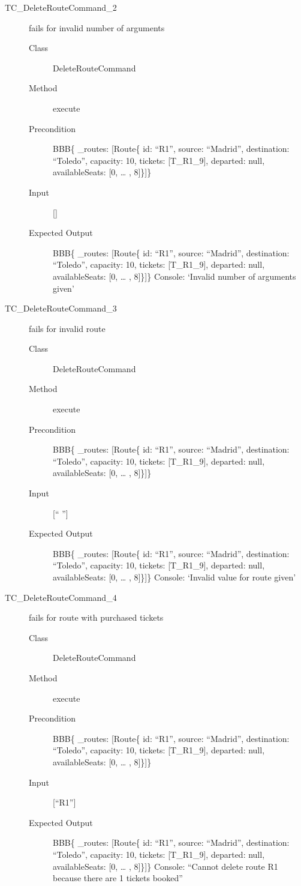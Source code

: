 \documentclass[11pt]{article}
\begin{document}
\begin{description}
\item[{TC\_DeleteRouteCommand\_2}] fails for invalid number of arguments
\begin{description}
\item[{Class}] DeleteRouteCommand
\item[{Method}] execute
\item[{Precondition}] BBB\{ \_routes: [Route\{ id: “R1”, source: “Madrid”, destination: “Toledo”, capacity: 10,  tickets: [T\_R1\_9], departed: null, availableSeats: [0, … , 8]\}]\}
\item[{Input}] []
\item[{Expected Output}] BBB\{ \_routes: [Route\{ id: “R1”, source: “Madrid”, destination: “Toledo”, capacity: 10,  tickets: [T\_R1\_9], departed: null, availableSeats: [0, … , 8]\}]\}
Console: ‘Invalid number of arguments given’
\end{description}

\item[{TC\_DeleteRouteCommand\_3}] fails for invalid route
\begin{description}
\item[{Class}] DeleteRouteCommand
\item[{Method}] execute
\item[{Precondition}] BBB\{ \_routes: [Route\{ id: “R1”, source: “Madrid”, destination: “Toledo”, capacity: 10,  tickets: [T\_R1\_9], departed: null, availableSeats: [0, … , 8]\}]\}
\item[{Input}] [“ ”]
\item[{Expected Output}] BBB\{ \_routes: [Route\{ id: “R1”, source: “Madrid”, destination: “Toledo”, capacity: 10,  tickets: [T\_R1\_9], departed: null, availableSeats: [0, … , 8]\}]\}
Console: ‘Invalid value for route given’
\end{description}

\item[{TC\_DeleteRouteCommand\_4}] fails for route with purchased tickets
\begin{description}
\item[{Class}] DeleteRouteCommand
\item[{Method}] execute
\item[{Precondition}] BBB\{ \_routes: [Route\{ id: “R1”, source: “Madrid”, destination: “Toledo”, capacity: 10,  tickets: [T\_R1\_9], departed: null, availableSeats: [0, … , 8]\}]\}
\item[{Input}] [“R1”]
\item[{Expected Output}] BBB\{ \_routes: [Route\{ id: “R1”, source: “Madrid”, destination: “Toledo”, capacity: 10,  tickets: [T\_R1\_9], departed: null, availableSeats: [0, … , 8]\}]\}
Console: “Cannot delete route R1 because there are 1 tickets booked”
\end{description}


\end{description}
\end{document}
